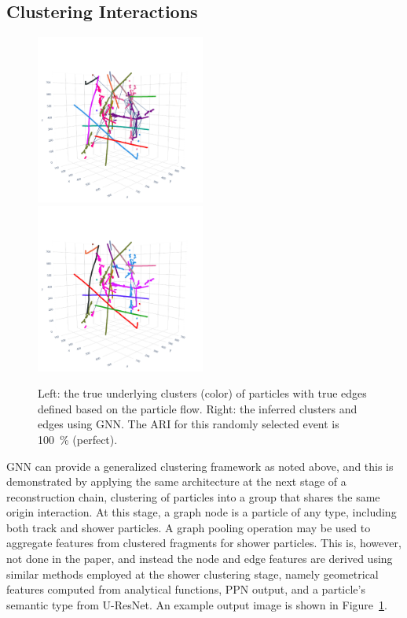 \documentclass{ws-rv9x6}
\begin{document}
\subsection{Clustering Interactions} 
\begin{figure}[t]
    \centering
    \includegraphics[width=0.495\textwidth,trim=1cm 0cm 1cm 3cm, clip]{figures/event_2138_4985_18647_20468_label.pdf}
    \includegraphics[width=0.495\textwidth,trim=1cm 0cm 1cm 3cm, clip]{figures/event_2138_4985_18647_20468_pred.pdf}
    \caption{Left: the true underlying clusters (color) of particles with true edges defined based on the particle flow. Right: the inferred clusters and edges using GNN. The ARI for this randomly selected event is 100~\% (perfect).}
    \label{fig:clustering:gnn_output_interaction}
\end{figure}
GNN can provide a generalized clustering framework as noted above, and this is demonstrated by applying the same architecture at the next stage of a reconstruction chain, clustering of particles into a group that shares the same origin interaction. At this stage, a graph node is a particle of any type, including both track and shower particles. A graph pooling operation may be used to aggregate features from clustered fragments for shower particles. This is, however, not done in the paper, and instead the node and edge features are derived using similar methods employed at the shower clustering stage, namely geometrical features computed from analytical functions, PPN output, and a particle's semantic type from U-ResNet. An example output image is shown in Figure~\ref{fig:clustering:gnn_output_interaction}. 
\end{document}
